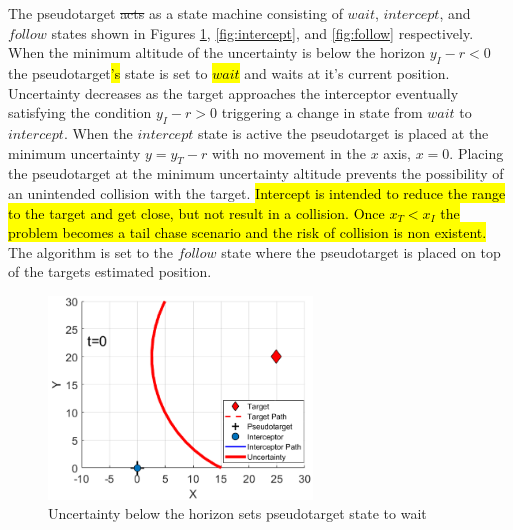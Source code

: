 \documentclass[conference]{IEEEtran}
\providecommand{\DIFadd}[1]{{\protect\color{blue}\uwave{#1}}} %
\providecommand{\DIFdel}[1]{{\protect\color{red}\sout{#1}}}                      %
\providecommand{\DIFaddbegin}{} %
\providecommand{\DIFaddend}{} %
\providecommand{\DIFdelbegin}{} %
\providecommand{\DIFdelend}{} %
\providecommand{\DIFaddbeginFL}{} %
\providecommand{\DIFaddendFL}{} %
\providecommand{\DIFdelbeginFL}{} %
\providecommand{\DIFdelendFL}{} %
\newcommand{\DIFscaledelfig}{0.5}
\newlength{\DIFdelgraphicswidth} %
\newlength{\DIFdelgraphicsheight} %
\newcommand{\DIFaddincludegraphics}[2][]{{\color{blue}\fbox{\DIFOincludegraphics[#1]{#2}}}} %
\newcommand{\DIFdelincludegraphics}[2][]{%
\sbox{\DIFdelgraphicsbox}{\DIFOincludegraphics[#1]{#2}}%
\settoboxwidth{\DIFdelgraphicswidth}{\DIFdelgraphicsbox} %
\settoboxtotalheight{\DIFdelgraphicsheight}{\DIFdelgraphicsbox} %
\scalebox{\DIFscaledelfig}{%
\parbox[b]{\DIFdelgraphicswidth}{\usebox{\DIFdelgraphicsbox}\\[-\baselineskip] \rule{\DIFdelgraphicswidth}{0em}}\llap{\resizebox{\DIFdelgraphicswidth}{\DIFdelgraphicsheight}{%
\setlength{\unitlength}{\DIFdelgraphicswidth}%
\begin{picture}(1,1)%
\thicklines\linethickness{2pt} %
{\color[rgb]{1,0,0}\put(0,0){\framebox(1,1){}}}%
{\color[rgb]{1,0,0}\put(0,0){\line( 1,1){1}}}%
{\color[rgb]{1,0,0}\put(0,1){\line(1,-1){1}}}%
\end{picture}%
}\hspace*{3pt}}} %
} %
\DeclareRobustCommand{\DIFaddbegin}{\DIFOaddbegin \let\includegraphics\DIFaddincludegraphics} %
\DeclareRobustCommand{\DIFaddend}{\DIFOaddend \let\includegraphics\DIFOincludegraphics} %
\DeclareRobustCommand{\DIFdelbegin}{\DIFOdelbegin \let\includegraphics\DIFdelincludegraphics} %
\DeclareRobustCommand{\DIFdelend}{\DIFOaddend \let\includegraphics\DIFOincludegraphics} %
\DeclareRobustCommand{\DIFaddbeginFL}{\DIFOaddbeginFL \let\includegraphics\DIFaddincludegraphics} %
\DeclareRobustCommand{\DIFaddendFL}{\DIFOaddendFL \let\includegraphics\DIFOincludegraphics} %
\DeclareRobustCommand{\DIFdelbeginFL}{\DIFOdelbeginFL \let\includegraphics\DIFdelincludegraphics} %
\DeclareRobustCommand{\DIFdelendFL}{\DIFOaddendFL \let\includegraphics\DIFOincludegraphics} %
\begin{document}
The pseudotarget \DIFdelbegin \DIFdel{acts }\DIFdelend \DIFaddbegin \DIFadd{acted }\DIFaddend as a state machine consisting of $wait$, $intercept$, and $follow$ states shown in Figures \ref{fig:wait}, \ref{fig:intercept}, and \ref{fig:follow} respectively. When the minimum altitude of the uncertainty is below the horizon $y_I-r<0$ the pseudotarget\hl{'s} state is set to \hl{$wait$} and waits at it's current position. Uncertainty decreases as the target approaches the interceptor eventually satisfying the condition $y_I-r >0$ triggering a change in state from $wait$ to $intercept$. When the $intercept$ state is active the pseudotarget is placed at the minimum uncertainty $y=y_T-r$ with no movement in the $x$ axis, $x=0$. Placing the pseudotarget at the minimum uncertainty altitude prevents the possibility of an unintended collision with the target. \hl{Intercept is intended to reduce the range to the target and get close, but not result in a collision. Once $x_T<x_I$ the problem becomes a tail chase scenario and the risk of collision is non existent.} The algorithm is set to the $follow$ state where the pseudotarget is placed on top of the targets estimated position. 









\begin{figure}[H]
	\centering
	\DIFdelbeginFL %
\DIFdelendFL \DIFaddbeginFL \includegraphics[width=7cm]{wait}
	\DIFaddendFL \caption{Uncertainty below the horizon sets pseudotarget state to wait}
	\label{fig:wait}
\end{figure}
\end{document}
